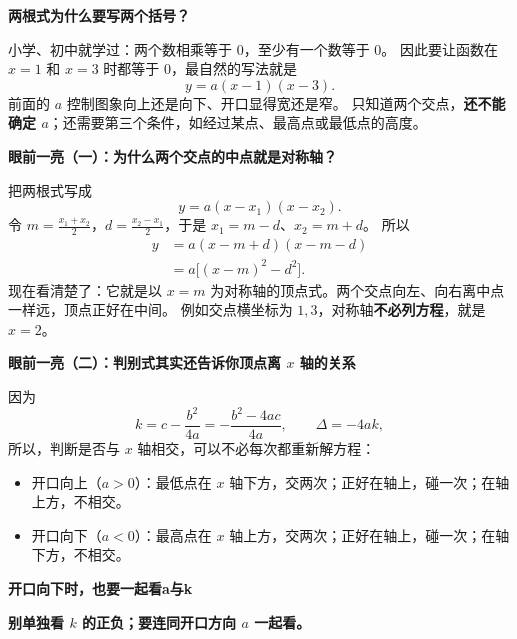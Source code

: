 \clearpage
\begin{explanationbox}
\textbf{\textcolor{CExplanation}{两根式为什么要写两个括号？}}


小学、初中就学过：两个数相乘等于 $0$，至少有一个数等于 $0$。
因此要让函数在 $x=1$ 和 $x=3$ 时都等于 $0$，最自然的写法就是
\[
y=a(x-1)(x-3).
\]
前面的 $a$ 控制图象向上还是向下、开口显得宽还是窄。
只知道两个交点，\textbf{还不能确定 $a$}；还需要第三个条件，如经过某点、最高点或最低点的高度。

\medskip

\end{explanationbox}
\clearpage
\begin{explanationbox}
\textbf{\textcolor{CExplanation}{眼前一亮（一）：为什么两个交点的中点就是对称轴？}}


把两根式写成
\[
y=a(x-x_1)(x-x_2).
\]
令 $m=\frac{x_1+x_2}{2}$，$d=\frac{x_2-x_1}{2}$，于是 $x_1=m-d$、$x_2=m+d$。
所以
\[
\begin{aligned}
y&=a(x-m+d)(x-m-d)\\
 &=a\bigl[(x-m)^2-d^2\bigr].
\end{aligned}
\]
现在看清楚了：它就是以 $x=m$ 为对称轴的顶点式。两个交点向左、向右离中点一样远，顶点正好在中间。
例如交点横坐标为 $1,3$，对称轴\textbf{不必列方程}，就是 $x=2$。

\medskip

\end{explanationbox}
\clearpage
\begin{explanationbox}
\textbf{\textcolor{CExplanation}{眼前一亮（二）：判别式其实还告诉你顶点离 $x$ 轴的关系}}


因为
\[
k=c-\frac{b^2}{4a}=-\frac{b^2-4ac}{4a},
\qquad\boxed{\Delta=-4ak},
\]
所以，判断是否与 $x$ 轴相交，可以不必每次都重新解方程：
\begin{itemize}[leftmargin=*,itemsep=0.3em,topsep=0.25em]
\item 开口向上（$a>0$）：最低点在 $x$ 轴下方，交两次；正好在轴上，碰一次；在轴上方，不相交。
\item 开口向下（$a<0$）：最高点在 $x$ 轴上方，交两次；正好在轴上，碰一次；在轴下方，不相交。
\end{itemize}

\end{explanationbox}\clearpage\begin{explanationbox}
\textbf{\textcolor{CExplanation}{开口向下时，也要一起看a与k}}

\textbf{别单独看 $k$ 的正负；要连同开口方向 $a$ 一起看。}

\medskip

\end{explanationbox}
